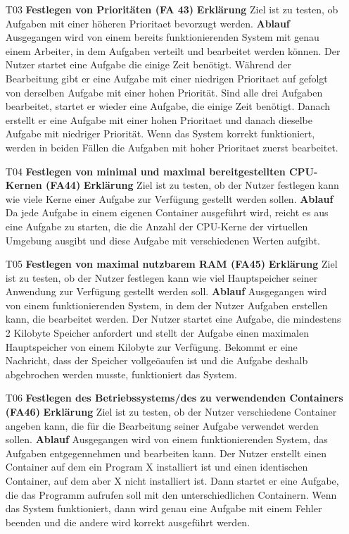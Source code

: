 \documentclass[a4paper,12pt]{article}
\begin{document}
\begin{itemize}
\item[T03] \textbf{Festlegen von Prioritäten (FA 43)}
\subitem \textbf{Erklärung} Ziel ist zu testen, ob Aufgaben mit einer höheren \gls{Prioritaet} bevorzugt werden.
\subitem \textbf{Ablauf} Ausgegangen wird von einem bereits funktionierenden System mit genau einem Arbeiter, in dem Aufgaben verteilt und bearbeitet werden können.
Der Nutzer startet eine Aufgabe die einige Zeit benötigt. Während der Bearbeitung gibt er eine Aufgabe mit einer niedrigen \gls{Prioritaet} auf gefolgt von derselben Aufgabe mit einer hohen Priorität.
Sind alle drei Aufgaben bearbeitet, startet er wieder eine Aufgabe, die einige Zeit benötigt. Danach erstellt er eine Aufgabe mit einer hohen \gls{Prioritaet} und danach dieselbe Aufgabe mit niedriger Priorität.
Wenn das System korrekt funktioniert, werden in beiden Fällen die Aufgaben mit hoher \gls{Prioritaet} zuerst bearbeitet.

\item[T04] \textbf{Festlegen von minimal und maximal bereitgestellten CPU-Kernen (FA44)}
\subitem \textbf{Erklärung} Ziel ist zu testen, ob der Nutzer festlegen kann wie viele Kerne einer Aufgabe zur Verfügung gestellt werden sollen.
\subitem \textbf{Ablauf} Da jede Aufgabe in einem eigenen Container ausgeführt wird, reicht es aus eine Aufgabe zu starten, die die Anzahl der CPU-Kerne der virtuellen Umgebung ausgibt und diese Aufgabe mit verschiedenen Werten aufgibt.

\item[T05] \textbf{Festlegen von maximal nutzbarem RAM (FA45)}
\subitem \textbf{Erklärung} Ziel ist zu testen, ob der Nutzer festlegen kann wie viel Hauptspeicher seiner Anwendung zur Verfügung gestellt werden soll.
\subitem \textbf{Ablauf} Ausgegangen wird von einem funktionierenden System, in dem der Nutzer Aufgaben erstellen kann, die bearbeitet werden.
Der Nutzer startet eine Aufgabe, die mindestens 2 Kilobyte Speicher anfordert und stellt der Aufgabe einen maximalen Hauptspeicher von einem Kilobyte zur Verfügung.
Bekommt er eine Nachricht, dass der Speicher vollgeöaufen ist und die Aufgabe deshalb abgebrochen werden musste, funktioniert das System.

\item[T06] \textbf{Festlegen des Betriebssystems/des zu verwendenden Containers (FA46)}
\subitem \textbf{Erklärung} Ziel ist zu testen, ob der Nutzer verschiedene Container angeben kann, die für die Bearbeitung seiner Aufgabe verwendet werden sollen.
\subitem \textbf{Ablauf} Ausgegangen wird von einem funktionierenden System, das Aufgaben entgegennehmen und bearbeiten kann.
Der Nutzer erstellt einen Container auf dem ein Program X installiert ist und einen identischen Container, auf dem aber X nicht installiert ist.
Dann startet er eine Aufgabe, die das Programm aufrufen soll mit den unterschiedlichen Containern. Wenn das System funktioniert, dann wird genau eine Aufgabe mit einem Fehler beenden und die andere wird korrekt ausgeführt werden.


\end{itemize}
\end{document}
